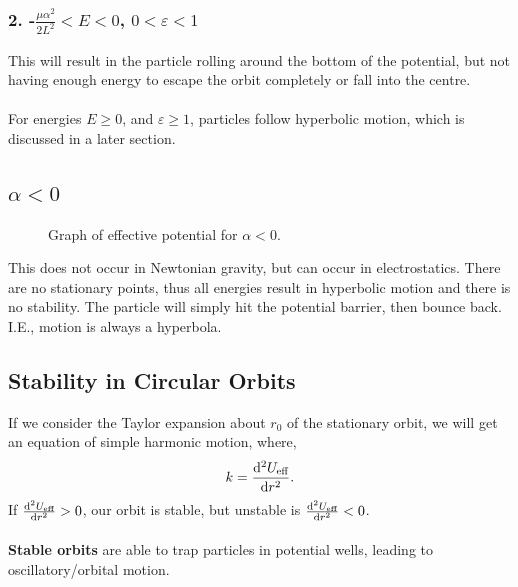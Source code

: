 \documentclass{book}
\begin{document}
\subsubsection{2. -$\frac{\mu\alpha^2}{2L^2} < E < 0$, $0 < \varepsilon < 1$}
This will result in the particle rolling around the bottom of the potential, but not having enough energy to escape the orbit completely or fall into the centre.
\\\\
For energies $E \geq 0$, and $\varepsilon \geq 1$, particles follow hyperbolic motion, which is discussed in a later section.
\subsection{$\alpha < 0$}
\begin{figure}
    \centering
    \caption{Graph of effective potential for $\alpha < 0$.}
    \label{fig:negativealpbha}
\end{figure}
This does not occur in Newtonian gravity, but can occur in electrostatics. There are no stationary points, thus all energies result in hyperbolic motion and there is no stability. The particle will simply hit the potential barrier, then bounce back. I.E., motion is always a hyperbola.
\subsection{Stability in Circular Orbits}
If we consider the Taylor expansion about $r_0$ of the stationary orbit, we will get an equation of simple harmonic motion, where,
\begin{equation}
    k = \dv[2]{U_\text{eff}}{r}(r_0).
\end{equation}
If $\dv[2]{U_{\text{eff}}}{r}(r_0) > 0$, our orbit is stable, but unstable is $\dv[2]{U_{\text{eff}}}{r}(r_0) < 0$. \\\\
\textbf{Stable orbits} are able to trap particles in potential wells, leading to oscillatory/orbital motion. 
\end{document}
